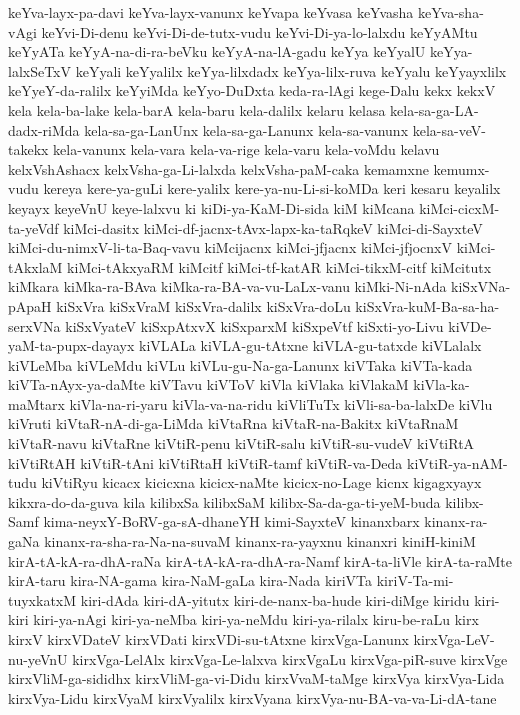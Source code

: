 {keYva-layx-pa-davi
keYva-layx-vanunx
keYvapa
keYvasa
keYvasha
keYva-sha-vAgi
keYvi-Di-denu
keYvi-Di-de-tutx-vudu
keYvi-Di-ya-lo-lalxdu
keYyAMtu
keYyATa
keYyA-na-di-ra-beVku
keYyA-na-lA-gadu
keYya
keYyalU
keYya-lalxSeTxV
keYyali
keYyalilx
keYya-lilxdadx
keYya-lilx-ruva
keYyalu
keYyayxlilx
keYyeY-da-ralilx
keYyiMda
keYyo-DuDxta
keda-ra-lAgi
kege-Dalu
kekx
kekxV
kela
kela-ba-lake
kela-barA
kela-baru
kela-dalilx
kelaru
kelasa
kela-sa-ga-LA-dadx-riMda
kela-sa-ga-LanUnx
kela-sa-ga-Lanunx
kela-sa-vanunx
kela-sa-veV-takekx
kela-vanunx
kela-vara
kela-va-rige
kela-varu
kela-voMdu
kelavu
kelxVshAshacx
kelxVsha-ga-Li-lalxda
kelxVsha-paM-caka
kemamxne
kemumx-vudu
kereya
kere-ya-guLi
kere-yalilx
kere-ya-nu-Li-si-koMDa
keri
kesaru
keyalilx
keyayx
keyeVnU
keye-lalxvu
ki
kiDi-ya-KaM-Di-sida
kiM
kiMcana
kiMci-cicxM-ta-yeVdf
kiMci-dasitx
kiMci-df-jacnx-tAvx-lapx-ka-taRqkeV
kiMci-di-SayxteV
kiMci-du-nimxV-li-ta-Baq-vavu
kiMcijacnx
kiMci-jfjacnx
kiMci-jfjocnxV
kiMci-tAkxlaM
kiMci-tAkxyaRM
kiMcitf
kiMci-tf-katAR
kiMci-tikxM-citf
kiMcitutx
kiMkara
kiMka-ra-BAva
kiMka-ra-BA-va-vu-LaLx-vanu
kiMki-Ni-nAda
kiSxVNa-pApaH
kiSxVra
kiSxVraM
kiSxVra-dalilx
kiSxVra-doLu
kiSxVra-kuM-Ba-sa-ha-serxVNa
kiSxVyateV
kiSxpAtxvX
kiSxparxM
kiSxpeVtf
kiSxti-yo-Livu
kiVDe-yaM-ta-pupx-dayayx
kiVLALa
kiVLA-gu-tAtxne
kiVLA-gu-tatxde
kiVLalalx
kiVLeMba
kiVLeMdu
kiVLu
kiVLu-gu-Na-ga-Lanunx
kiVTaka
kiVTa-kada
kiVTa-nAyx-ya-daMte
kiVTavu
kiVToV
kiVla
kiVlaka
kiVlakaM
kiVla-ka-maMtarx
kiVla-na-ri-yaru
kiVla-va-na-ridu
kiVliTuTx
kiVli-sa-ba-lalxDe
kiVlu
kiVruti
kiVtaR-nA-di-ga-LiMda
kiVtaRna
kiVtaR-na-Bakitx
kiVtaRnaM
kiVtaR-navu
kiVtaRne
kiVtiR-penu
kiVtiR-salu
kiVtiR-su-vudeV
kiVtiRtA
kiVtiRtAH
kiVtiR-tAni
kiVtiRtaH
kiVtiR-tamf
kiVtiR-va-Deda
kiVtiR-ya-nAM-tudu
kiVtiRyu
kicacx
kicicxna
kicicx-naMte
kicicx-no-Lage
kicnx
kigagxyayx
kikxra-do-da-guva
kila
kilibxSa
kilibxSaM
kilibx-Sa-da-ga-ti-yeM-buda
kilibx-Samf
kima-neyxY-BoRV-ga-sA-dhaneYH
kimi-SayxteV
kinanxbarx
kinanx-ra-gaNa
kinanx-ra-sha-ra-Na-na-suvaM
kinanx-ra-yayxnu
kinanxri
kiniH-kiniM
kirA-tA-kA-ra-dhA-raNa
kirA-tA-kA-ra-dhA-ra-Namf
kirA-ta-liVle
kirA-ta-raMte
kirA-taru
kira-NA-gama
kira-NaM-gaLa
kira-Nada
kiriVTa
kiriV-Ta-mi-tuyxkatxM
kiri-dAda
kiri-dA-yitutx
kiri-de-nanx-ba-hude
kiri-diMge
kiridu
kiri-kiri
kiri-ya-nAgi
kiri-ya-neMba
kiri-ya-neMdu
kiri-ya-rilalx
kiru-be-raLu
kirx
kirxV
kirxVDateV
kirxVDati
kirxVDi-su-tAtxne
kirxVga-Lanunx
kirxVga-LeV-nu-yeVnU
kirxVga-LelAlx
kirxVga-Le-lalxva
kirxVgaLu
kirxVga-piR-suve
kirxVge
kirxVliM-ga-sididhx
kirxVliM-ga-vi-Didu
kirxVvaM-taMge
kirxVya
kirxVya-Lida
kirxVya-Lidu
kirxVyaM
kirxVyalilx
kirxVyana
kirxVya-nu-BA-va-va-Li-dA-tane
}
